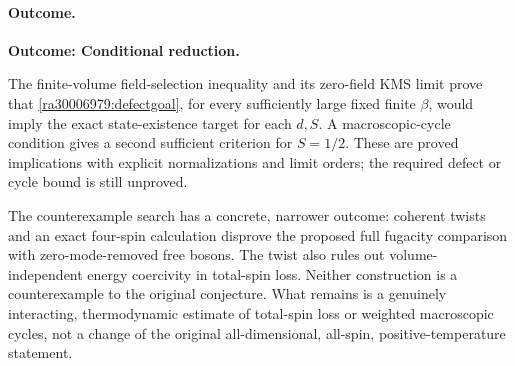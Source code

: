 \documentclass[11pt]{article}
\begin{document}
	\paragraph{Outcome.}
	\textbf{Outcome: Conditional reduction.}
	
	The finite-volume field-selection inequality and its zero-field KMS
	limit prove that \eqref{ra30006979:defectgoal}, for every sufficiently large
	fixed finite $\beta$, would imply the exact state-existence target for
	each $d,S$. A macroscopic-cycle condition gives a second sufficient
	criterion for $S=1/2$. These are proved implications with explicit
	normalizations and limit orders; the required defect or cycle bound
	is still unproved.
	
	The counterexample search has a concrete, narrower outcome: coherent
	twists and an exact four-spin calculation disprove the proposed full
	fugacity comparison with zero-mode-removed free bosons. The twist also
	rules out volume-independent energy coercivity in total-spin loss.
	Neither construction is a counterexample to the original conjecture.
	What remains is a genuinely interacting, thermodynamic estimate of
	total-spin loss or weighted macroscopic cycles, not a change of the
	original all-dimensional, all-spin, positive-temperature statement.
\end{document}
